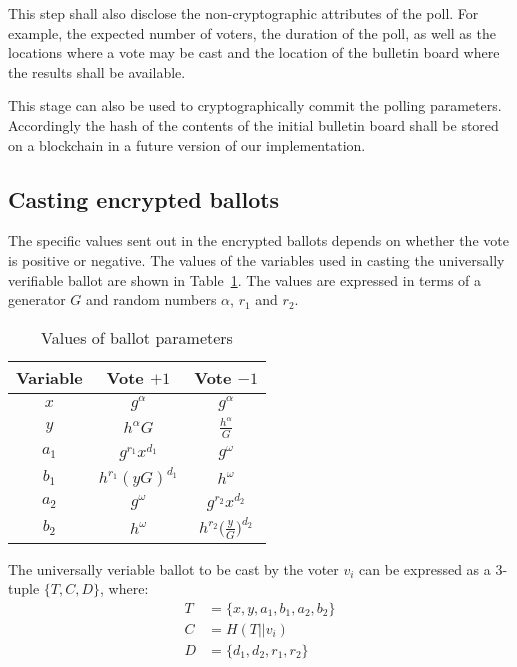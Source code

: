 This step shall also disclose the non-cryptographic
attributes of the poll. For example, the expected number of voters,
the duration of the poll, as well as the
locations where a vote may be cast and the location of the
bulletin board where the results shall be available.

This stage can also be used to cryptographically commit the
polling parameters.  Accordingly the hash of the contents of the
initial bulletin board shall be stored on a blockchain
in a future version of our implementation.


\subsection{Casting encrypted ballots}

The specific values sent out in the encrypted ballots depends on
whether the vote is positive or negative.  The values of the variables
used in casting the universally verifiable ballot are shown in
Table~\ref{table:ballotparams}.  The values are expressed in terms of
a generator $G$ and random numbers $\alpha$, $r_1$ and $r_2$.



\begin{table}[t]
\caption{Values of ballot parameters}
\begin{center}
  \begin{tabular}{c|c|c} 
    Variable & Vote $+1$ & Vote $-1$ \\\hline
    $x$   &  $g^\alpha$ &   $g^\alpha$ \\
    $y$   &  $h^\alpha G$ & $\frac{h^\alpha}{G}$  \\
    $a_1$ &  $g^{r_1}x^{d_1}$ & $g^\omega$  \\
    $b_1$ &  $h^{r_1}(yG)^{d_1}$ & $h^\omega$  \\
    $a_2$ &  $g^\omega$ &  $g^{r_2}x^{d_2}$ \\
    $b_2$ &  $h^\omega$ & $h^{r_2} \big( \frac{y}{G} \big)^{d_2}$ \\
\end{tabular}
\label{table:ballotparams}
\end{center}
\end{table}



The universally veriable ballot to be cast by the voter $v_i$
can be expressed as a 3-tuple $\{T,C,D\}$, where:
\begin{equation} \label{eq3}
\begin{split}
T & = \{ x, y, a_1, b_1, a_2, b_2 \} \\
C & = H( T || v_i ) \\
D & = \{d_1, d_2, r_1, r_2 \} 
\end{split}
\end{equation}

